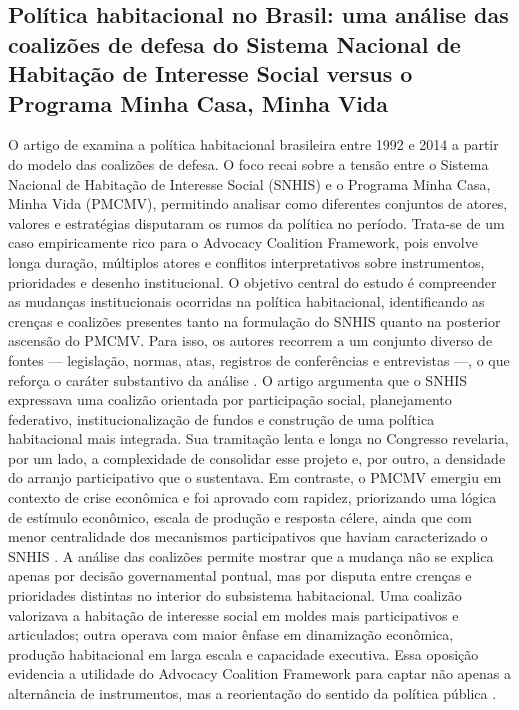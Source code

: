 \documentclass[12pt,a4paper]{article}
\begin{document}
\subsection{Política habitacional no Brasil: uma análise das coalizões de defesa do Sistema Nacional de Habitação de Interesse Social versus o Programa Minha Casa, Minha Vida}
\label{sec:org960dff7}
O artigo de \textcite{ferreira2019habitacional} examina a política habitacional brasileira entre 1992 e 2014 a partir do modelo das coalizões de defesa. O foco recai sobre a tensão entre o Sistema Nacional de Habitação de Interesse Social (SNHIS) e o Programa Minha Casa, Minha Vida (PMCMV), permitindo analisar como diferentes conjuntos de atores, valores e estratégias disputaram os rumos da política no período. Trata-se de um caso empiricamente rico para o Advocacy Coalition Framework, pois envolve longa duração, múltiplos atores e conflitos interpretativos sobre instrumentos, prioridades e desenho institucional.
O objetivo central do estudo é compreender as mudanças institucionais ocorridas na política habitacional, identificando as crenças e coalizões presentes tanto na formulação do SNHIS quanto na posterior ascensão do PMCMV. Para isso, os autores recorrem a um conjunto diverso de fontes — legislação, normas, atas, registros de conferências e entrevistas —, o que reforça o caráter substantivo da análise \autocite{ferreira2019habitacional}.
O artigo argumenta que o SNHIS expressava uma coalizão orientada por participação social, planejamento federativo, institucionalização de fundos e construção de uma política habitacional mais integrada. Sua tramitação lenta e longa no Congresso revelaria, por um lado, a complexidade de consolidar esse projeto e, por outro, a densidade do arranjo participativo que o sustentava. Em contraste, o PMCMV emergiu em contexto de crise econômica e foi aprovado com rapidez, priorizando uma lógica de estímulo econômico, escala de produção e resposta célere, ainda que com menor centralidade dos mecanismos participativos que haviam caracterizado o SNHIS \autocite{ferreira2019habitacional}.
A análise das coalizões permite mostrar que a mudança não se explica apenas por decisão governamental pontual, mas por disputa entre crenças e prioridades distintas no interior do subsistema habitacional. Uma coalizão valorizava a habitação de interesse social em moldes mais participativos e articulados; outra operava com maior ênfase em dinamização econômica, produção habitacional em larga escala e capacidade executiva. Essa oposição evidencia a utilidade do Advocacy Coalition Framework para captar não apenas a alternância de instrumentos, mas a reorientação do sentido da política pública \autocites{ferreira2019habitacional}{araujoSilva2022coalizoes}.
\end{document}
